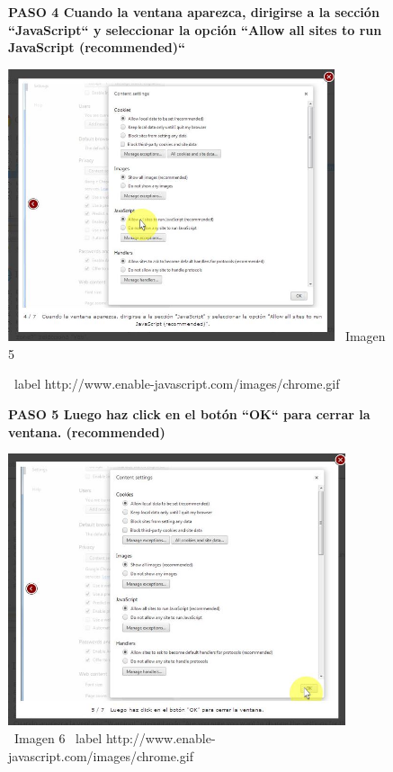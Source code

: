 \documentclass[11pt]{article} %
\begin{document}
\begin{figure}
\begin{center}
\begin{center}

\bf PASO 4
Cuando la ventana aparezca, dirigirse a la sección ``JavaScript``  y seleccionar la opción ``Allow all sites to run JavaScript (recommended)``
\newline
\end{center}

\includegraphics[height=8cm, width=8 cm] {imagenes/chrome 04.jpg}
\newline
\ Imagen 5

\ label { http://www.enable-javascript.com/images/chrome.gif }

\begin{center}
\bf PASO 5
Luego haz click en el botón ``OK`` para cerrar la ventana. (recommended)
\newline
\end{center}

\includegraphics[height=8cm, width=8 cm] {imagenes/chrome 05.jpg}
\newline
\newline
\ Imagen 6
\ label { http://www.enable-javascript.com/images/chrome.gif }
\newline
\end{center}
\end{figure}
\end{document}
